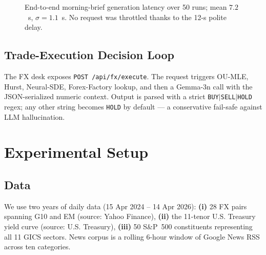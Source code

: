 \documentclass[conference]{IEEEtran}
\begin{document}
\begin{figure}[!t]
\centering
{}
\caption{End-to-end morning-brief generation latency over 50 runs; mean $7.2$~s, $\sigma=1.1$~s. No request was throttled thanks to the 12-s polite delay.}
\label{fig:latency}
\end{figure}

\subsection{Trade-Execution Decision Loop}
The FX desk exposes \texttt{POST /api/fx/execute}. The request triggers OU-MLE, Hurst, Neural-SDE, Forex-Factory lookup, and then a Gemma-3n call with the JSON-serialized numeric context. Output is parsed with a strict \texttt{BUY}$|$\texttt{SELL}$|$\texttt{HOLD} regex; any other string becomes \texttt{HOLD} by default --- a conservative fail-safe against LLM hallucination.

\section{Experimental Setup}
\label{sec:setup}

\subsection{Data}
We use two years of daily data (15 Apr 2024 -- 14 Apr 2026): \textbf{(i)} 28 FX pairs spanning G10 and EM (source: Yahoo Finance), \textbf{(ii)} the 11-tenor U.S. Treasury yield curve (source: U.S. Treasury), \textbf{(iii)} 50 S\&P~500 constituents representing all 11 GICS sectors. News corpus is a rolling 6-hour window of Google News RSS across ten categories.
\end{document}
